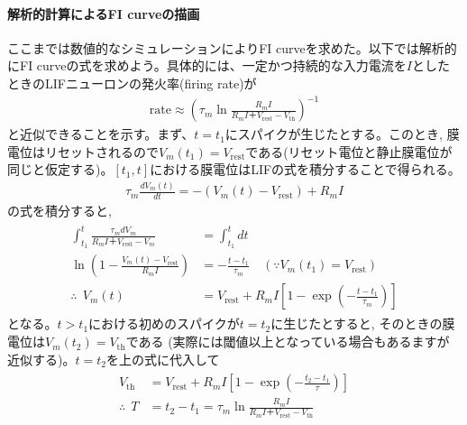 \documentclass[letterpaper,10pt,english]{sphinxmanual}
\begin{document}
\paragraph{解析的計算によるF\sphinxhyphen{}I curveの描画}
\label{\detokenize{2-4_lif:id8}}
ここまでは数値的なシミュレーションによりF\sphinxhyphen{}I curveを求めた。以下では解析的にF\sphinxhyphen{}I curveの式を求めよう。具体的には、一定かつ持続的な入力電流を\(I\)としたときのLIFニューロンの発火率(firing rate)が
\begin{equation*}
\begin{split}
\begin{equation}
\text{rate}\approx \left(\tau_m \ln \frac{R_mI}{R_mI＋V_\text{rest}-V_{\text{th}}}\right)^{-1}
\end{equation}
\end{split}
\end{equation*}
と近似できることを示す。まず、\(t=t_1\)にスパイクが生じたとする。このとき, 膜電位はリセットされるので\(V_m(t_1)=V_\text{rest}\)である(リセット電位と静止膜電位が同じと仮定する)。\([t_1, t]\)における膜電位はLIFの式を積分することで得られる。
\begin{equation*}
\begin{split}
\begin{equation}
\tau_m \frac{dV_{m}(t)}{dt}=-(V_{m}(t)-V_\text{rest})+R_m I
\end{equation}
\end{split}
\end{equation*}
の式を積分すると,
\begin{equation*}
\begin{split}
\begin{aligned}
\int_{t_1}^{t} \frac{\tau_m dV_m}{R_mI＋V_\text{rest}-V_m}&=\int_{t_1}^{t} dt\\
\ln \left(1-\frac{V_m(t)-V_\text{rest}}{R_mI}\right)&=-\frac{t-t_1}{\tau_m} \quad (\because V_m(t_1)=V_\text{rest})\\
\therefore\ \ V_m(t) &=V_\text{rest} + R_mI\left[1-\exp\left(-\frac{t-t_1}{\tau_m}\right)\right] 
\end{aligned}
\end{split}
\end{equation*}
となる。\(t>t_1\)における初めのスパイクが\(t=t_2\)に生じたとすると, そのときの膜電位は\(V_m(t_2)=V_{\text{th}}\)である (実際には閾値以上となっている場合もあるますが近似する)。\(t=t_2\)を上の式に代入して
\begin{equation*}
\begin{split}
\begin{align}
V_{\text{th}}&=V_\text{rest} + R_mI\left[1-\exp\left(-\frac{t_2-t_1}{\tau}\right)\right] \\
\therefore\ \ T&= t_2-t_1 = \tau_m \ln \frac{R_mI}{R_mI＋V_\text{rest}-V_{\text{th}}}
\end{align}
\end{split}
\end{equation*}
\end{document}

